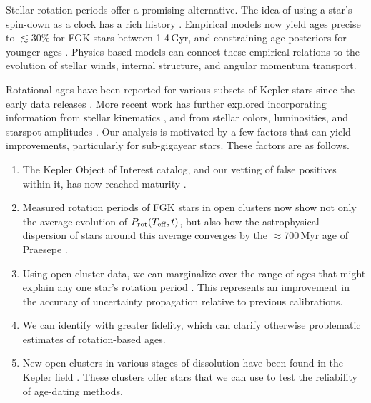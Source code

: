 \documentclass[11pt,twocolumn,tighten]{aastex63}
\begin{document}
Stellar rotation periods offer a promising alternative.  The idea of
using a star's spin-down as a clock has a rich history
\citep{Skumanich_1972,Noyes_1984,Kawaler_1989,Barnes03,Mamajek_2008,Angus_2015,2023ApJ...954L..50E}.
Empirical models now yield ages precise to $\lesssim$30\% for FGK
stars between 1-4\,Gyr, and constraining age posteriors for younger
ages \citep{Bouma_2023}.  Physics-based models
\citep{Matt_2015,Gallet_Bouvier_2015,Spada_2020} can connect these
empirical relations to the evolution of stellar winds, internal
structure, and angular momentum transport.

Rotational ages have been reported for various subsets of Kepler
stars since the early data releases
\citep[e.g.][]{Walkowicz_2013,McQuillan_2014,Reinhold_2015,Angus_2018}.
More recent work has further explored incorporating information from
stellar kinematics \citep{2021AJ....161..189L,2024AJ....167..159L},
and from stellar colors, luminosities, and starspot amplitudes
\citep{2023ApJ...952..131M}.  Our analysis is motivated by a few
factors that can yield improvements, particularly for sub-gigayear
stars.   These factors are as follows.

\begin{enumerate}[label={\it \roman*)},leftmargin=12pt,topsep=0pt,itemsep=-1ex,partopsep=1ex,parsep=1ex]
  \item The Kepler Object of Interest catalog, and our vetting of
    false positives within it, has now reached maturity
    \citep[e.g.][]{Thompson_2018}.
  \item Measured rotation periods of FGK stars in open clusters now
    show not only the average evolution of $P_{\rm rot}(T_{\rm
    eff},t)$, but also how the astrophysical dispersion of stars
    around this average converges by the $\approx$700\,Myr age of
    Praesepe
    \citep[e.g.][]{Curtis_2019_ngc6811,Gillen_2020,Rampalli_2021,Fritzewski_2021,Rebull_2022,Dungee_2022,2023AJ....166...14B}.
  \item Using open cluster data, we can marginalize over the range of
    ages that might explain any one star's rotation period
    \citep{Bouma_2023}.  This represents an improvement in the
    accuracy of uncertainty propagation relative to previous
    calibrations.
  \item We can identify  with greater fidelity, which can clarify otherwise problematic estimates of
    rotation-based ages.
  \item New open clusters in various stages of dissolution have been
    found in the Kepler field
    \cite[e.g.][]{2019AJ....158..122K,Barber_2022,Kerr2024}.
    These clusters offer stars that we can use to test
    the reliability of  age-dating methods.
\end{enumerate}
\end{document}
